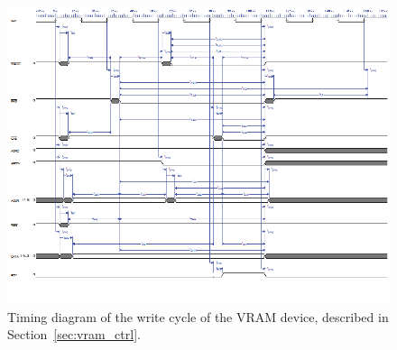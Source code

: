 \documentclass[titlepage]{scrartcl}
\begin{document}
	\begin{figure}[h!]
	\vspace{-2cm}
	\centerline{\includegraphics[width=25cm, angle=90, origin=c]{img/vram_write.png}}
		\vspace{1cm}
                	\caption{Timing diagram of the write cycle of the VRAM device, described in Section~\ref{sec:vram_ctrl}.}
               	\label{fig:vram_write}
	\end{figure}

	\clearpage
\end{document}
